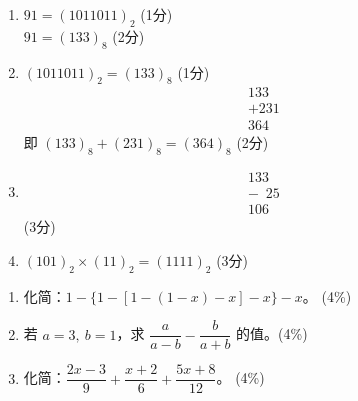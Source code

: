 \documentclass[12pt,a4paper]{exam-zh}
\begin{document}
\begin{solution}
    \begin{enumerate}[label=(\alph*)]
        \item $91 = (1011011)_2$ \hfill (1分) \\
        $91 = (133)_8$ \hfill (2分)

        \item $(1011011)_2 = (133)_8$ \hfill (1分) \\
        $$
        \begin{array}{r}
          133 \\
        + 231 \\
        \hline
          364
        \end{array}
        $$
        即 $(133)_8 + (231)_8 = (364)_8$ \hfill (2分)

        \item
        $$
        \begin{array}{r}
          133 \\
        - \phantom{1}25 \\
        \hline
          106
        \end{array}
        $$
        \hfill (3分)

        \item $(101)_2 \times (11)_2 = (1111)_2$ \hfill (3分)
    \end{enumerate}
\end{solution}


\begin{question}[points = 12]
    \begin{enumerate}[label=(\alph*)]
        \item 化简：$1-\{1-[1-(1-x)-x]-x\}-x$。 \hfill (4\%)
        \item 若 $a=3,\ b=1$，求 $\dfrac{a}{a-b} - \dfrac{b}{a+b}$ 的值。\hfill (4\%)
        \item 化简：$\dfrac{2x-3}{9} + \dfrac{x+2}{6} + \dfrac{5x+8}{12}$。 \hfill (4\%)
    \end{enumerate}
\end{question}
\end{document}
